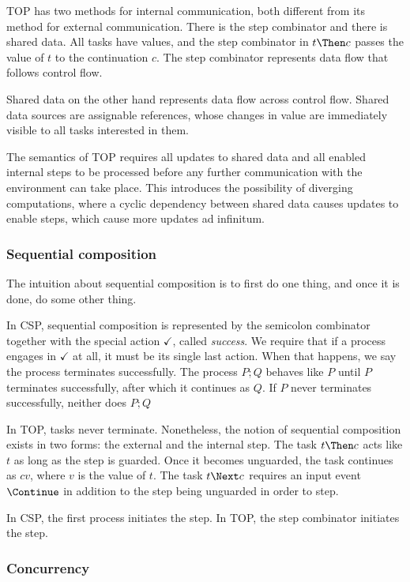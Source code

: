 TOP has two methods for internal communication, both different from its method for external communication.
There is the step combinator and there is shared data.
All tasks have values, and the step combinator in $t \Then c$ passes the value of $t$ to the continuation $c$.
The step combinator represents data flow that follows control flow.

Shared data on the other hand represents data flow across control flow.
Shared data sources are assignable references, whose changes in value are immediately visible to all tasks interested in them.

The semantics of TOP requires all updates to shared data and all enabled internal steps to be processed before any further communication with the environment can take place.
This introduces the possibility of diverging computations, where a cyclic dependency between shared data causes updates to enable steps, which cause more updates ad infinitum.


\subsubsection{Sequential composition}

The intuition about sequential composition is to first do one thing, and once it is done, do some other thing.

In CSP, sequential composition is represented by the semicolon combinator together with the special action $\checkmark$, called \emph{success}.
We require that if a process engages in $\checkmark$ at all, it must be its single last action.
When that happens, we say the process terminates successfully.
The process $P;Q$ behaves like $P$ until $P$ terminates successfully, after which it continues as $Q$.
If $P$ never terminates successfully, neither does $P;Q$

In TOP, tasks never terminate.
Nonetheless, the notion of sequential composition exists in two forms: the external and the internal step.
The task $t \Then c$ acts like $t$ as long as the step is guarded.
Once it becomes unguarded, the task continues as $cv$, where $v$ is the value of $t$.
The task $t \Next c$ requires an input event $\Continue$ in addition to the step being unguarded in order to step.

In CSP, the first process initiates the step.
In TOP, the step combinator initiates the step.


\subsubsection{Concurrency}

